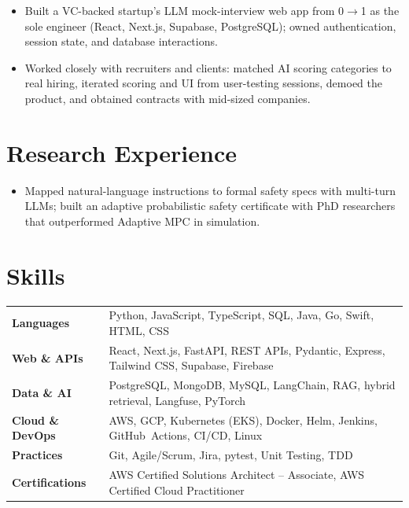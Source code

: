\documentclass[11pt, letterpaper]{article}
\begin{document}
\begin{itemize}
  \item Built a VC-backed startup's LLM mock-interview web app from 0$\to$1 as the sole engineer (React, Next.js, Supabase, PostgreSQL); owned authentication, session state, and database interactions.
  \item Worked closely with recruiters and clients: matched AI scoring categories to real hiring, iterated scoring and UI from user-testing sessions, demoed the product, and obtained contracts with mid-sized companies.
\end{itemize}

\section{Research Experience}
\begin{itemize}
  \item Mapped natural-language instructions to formal safety specs with multi-turn LLMs; built an adaptive probabilistic safety certificate with PhD researchers that outperformed Adaptive MPC in simulation.
\end{itemize}

\section{Skills}
\begin{tabularx}{\textwidth}{@{}l @{\hspace{7pt}} >{\raggedright\arraybackslash}X@{}}
  \textbf{Languages} & Python, JavaScript, TypeScript, SQL, Java, Go, Swift, HTML, CSS \\[1pt]
  \textbf{Web \& APIs} & React, Next.js, FastAPI, REST APIs, Pydantic, Express, Tailwind CSS, Supabase, Firebase \\[1pt]
  \textbf{Data \& AI} & PostgreSQL, MongoDB, MySQL, LangChain, RAG, hybrid retrieval, Langfuse, PyTorch \\[1pt]
  \textbf{Cloud \& DevOps} & AWS, GCP, Kubernetes (EKS), Docker, Helm, Jenkins, GitHub~Actions, CI/CD, Linux \\[1pt]
  \textbf{Practices} & Git, Agile/Scrum, Jira, pytest, Unit Testing, TDD \\[1pt]
  \textbf{Certifications} & AWS Certified Solutions Architect -- Associate, AWS Certified Cloud Practitioner \\
\end{tabularx}
\end{document}
